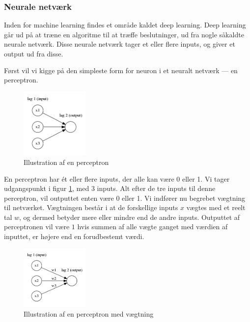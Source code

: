 \subsubsection{Neurale netværk}
Inden for machine learning findes et område kaldet deep learning. Deep learning går ud på at træne en algoritme til at træffe beslutninger, ud fra nogle såkaldte neurale netværk. Disse neurale netværk tager et eller flere inputs, og giver et output ud fra disse. 

Først vil vi kigge på den simpleste form for neuron i et neuralt netværk --- en perceptron\cite{neural}.
\begin{figure}[h!]
	\centering
	\includegraphics[width=0.3\textwidth]{images/neural1.png}
	\caption{Illustration af en perceptron}
	\label{fig:perceptron}
\end{figure}

En perceptron har \'et eller flere inputs, der alle kan være 0 eller 1. Vi tager udgangspunkt i figur \ref{fig:perceptron}, med 3 inputs. Alt efter de tre inputs til denne perceptron, vil outputtet enten være 0 eller 1. Vi indfører nu begrebet vægtning til netværket. Vægtningen består i at de forskellige inputs $x$ vægtes med et reelt tal $w$, og dermed betyder mere eller mindre end de andre inputs. Outputtet af perceptronen vil være $1$ hvis summen af alle vægte ganget med værdien af inputtet, er højere end en forudbestemt værdi.

\begin{figure}[h!]
	\centering
	\includegraphics[width=0.3\textwidth]{images/neural2.png}
	\caption{Illustration af en perceptron med vægtning}
	\label{fig:perceptronWeight}
\end{figure}


